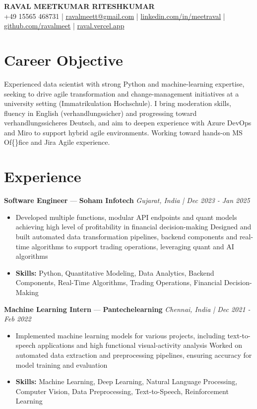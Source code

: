 \documentclass[a4paper,10pt]{article}
\begin{document}
\begin{center}
  {\Large\bfseries RAVAL MEETKUMAR RITESHKUMAR}\\[2pt]
  {\small +49 15565 468731 \;|\; \href{mailto:ravalmeett@gmail.com}{ravalmeett@gmail.com} \;|\; \href{https://www.linkedin.com/in/meetraval/}{linkedin.com/in/meetraval} \;|\; \href{https://github.com/ravalmeet}{github.com/ravalmeet} \;|\; \href{https://raval.vercel.app/}{raval.vercel.app}}
\end{center}
\vspace{-3pt}

\section*{Career Objective}
Experienced data scientist with strong Python and machine-learning expertise, seeking to drive agile transformation and change-management initiatives at a university setting (Immatrikulation Hochschule). I bring moderation skills, fluency in English (verhandlungssicher) and progressing toward verhandlungssicheres Deutsch, and aim to deepen experience with Azure DevOps and Miro to support hybrid agile environments. Working toward hands-on MS Of\{\}fice and Jira Agile experience.\par

\section*{Experience}
\textbf{Software Engineer} — \textbf{Soham Infotech} \hfill \textit{Gujarat, India \;|\; Dec 2023 - Jan 2025}\par
\vspace{1pt}
\begin{itemize}
  \item Developed multiple functions, modular API endpoints and quant models achieving high level of profitability in financial decision-making Designed and built automated data transformation pipelines, backend components and real-time algorithms to support trading operations, leveraging quant and AI algorithms
  \item \textbf{Skills:} Python, Quantitative Modeling, Data Analytics, Backend Components, Real-Time Algorithms, Trading Operations, Financial Decision-Making
\end{itemize}
\vspace{3pt}
\textbf{Machine Learning Intern} — \textbf{Pantechelearning} \hfill \textit{Chennai, India \;|\; Dec 2021 - Feb 2022}\par
\vspace{1pt}
\begin{itemize}
  \item Implemented machine learning models for various projects, including text-to-speech applications and high functional visual-activity analysis Worked on automated data extraction and preprocessing pipelines, ensuring accuracy for model training and evaluation
  \item \textbf{Skills:} Machine Learning, Deep Learning, Natural Language Processing, Computer Vision, Data Preprocessing, Text-to-Speech, Reinforcement Learning
\end{itemize}
\end{document}
